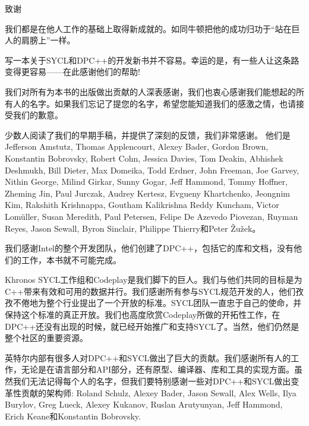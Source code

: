 \begin{flushright}
 致谢
\end{flushright}

我们都是在他人工作的基础上取得新成就的。如同牛顿把他的成功归功于“站在巨人的肩膀上”一样。\par

写一本关于SYCL和DPC++的开发新书并不容易。幸运的是，有一些人让这条路变得更容易——在此感谢他们的帮助!\par

我们对所有为本书的出版做出贡献的人深表感谢，我们也衷心感谢我们能想起的所有人的名字。如果我们忘记了提您的名字，希望您能知道我们的感激之情，也请接受我们的歉意。\par

少数人阅读了我们的早期手稿，并提供了深刻的反馈，我们非常感谢。 他们是Jefferson Amstutz, Thomas Applencourt, Alexey Bader, Gordon Brown, Konstantin Bobrovsky, Robert Cohn, Jessica Davies, Tom Deakin, Abhishek Deshmukh, Bill Dieter, Max Domeika, Todd Erdner, John Freeman, Joe Garvey, Nithin George, Milind Girkar, Sunny Gogar, Jeff Hammond, Tommy Hoffner, Zheming Jin, Paul Jurczak, Audrey Kertesz, Evgueny Khartchenko, Jeongnim Kim, Rakshith Krishnappa, Goutham Kalikrishna Reddy Kuncham, Victor Lomüller, Susan Meredith, Paul Petersen, Felipe De Azevedo Piovezan, Ruyman Reyes, Jason Sewall, Byron Sinclair, Philippe Thierry和Peter Žužek。 \par

我们感谢Intel的整个开发团队，他们创建了DPC++，包括它的库和文档，没有他们的工作，本书就不可能完成。\par

Khronos SYCL工作组和Codeplay是我们脚下的巨人。我们与他们共同的目标是为C++带来有效和可用的数据并行。我们感谢所有参与SYCL规范开发的人，他们孜孜不倦地为整个行业提出了一个开放的标准。SYCL团队一直忠于自己的使命，并保持这个标准的真正开放。我们也高度欣赏Codeplay所做的开拓性工作，在DPC++还没有出现的时候，就已经开始推广和支持SYCL了。当然，他们仍然是整个社区的重要资源。\par

英特尔内部有很多人对DPC++和SYCL做出了巨大的贡献。我们感谢所有人的工作，无论是在语言部分和API部分，还有原型、编译器、库和工具的实现方面。虽然我们无法记得每个人的名字，但我们要特别感谢一些对DPC++和SYCL做出变革性贡献的架构师: Roland Schulz, Alexey Bader, Jason Sewall, Alex Wells, Ilya Burylov, Greg Lueck, Alexey Kukanov, Ruslan Arutyunyan, Jeff Hammond, Erich Keane和Konstantin Bobrovsky.\par

